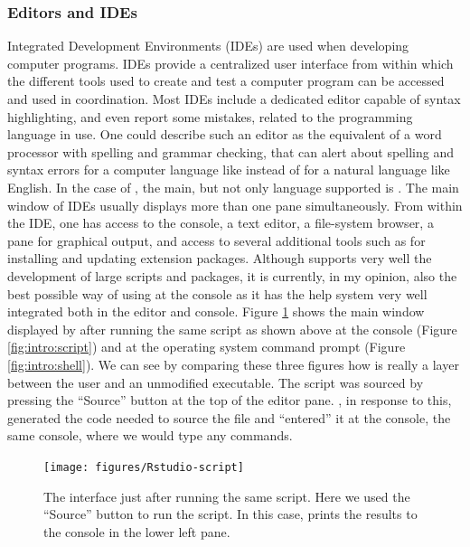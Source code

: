 \documentclass[krantz2]{krantz}\usepackage{knitr}
\begin{document}
\subsubsection{Editors and IDEs}

Integrated Development Environments (IDEs) are used when developing computer programs. IDEs provide a centralized user interface from within which the different tools used to create and test a computer program can be accessed and used in coordination. Most IDEs include a dedicated editor capable of syntax highlighting, and even report some mistakes, related to the programming language in use. One could describe such an editor as the equivalent of a word processor with spelling and grammar checking, that can alert about spelling and syntax errors for a computer language like \Rlang instead of for a natural language like English. In the case of \RStudio, the main, but not only language supported is \Rlang. The main window of IDEs usually displays more than one pane simultaneously. From within the \RStudio IDE, one has access to the \Rpgrm console, a text editor, a file-system browser, a pane for graphical output, and access to several additional tools such as for installing and updating extension packages. Although \RStudio supports very well the development of large scripts and packages, it is currently, in my opinion, also the best possible way of using \Rpgrm at the console as it has the \Rpgrm help system very well integrated both in the editor and \Rlang console. Figure \ref{fig:intro:rstudio} shows the main window displayed by \RStudio after running the same script as shown above at the \Rpgrm console (Figure \ref{fig:intro:script}) and at the operating system command prompt (Figure \ref{fig:intro:shell}). We can see by comparing these three figures how \RStudio is really a layer between the user and an unmodified \Rpgrm executable. The script was sourced by pressing the ``Source'' button at the top of the editor pane. \RStudio, in response to this, generated the code needed to source the file and ``entered'' it at the console, the same console, where we would type any \Rpgrm commands.

\begin{figure}
  \centering
  \texttt{[image: figures/Rstudio-script]}
  \caption[Script in Rstudio]{The \RStudio interface just after running the same script. Here we used the ``Source'' button to run the script. In this case, \Rpgrm prints the results to the \Rpgrm console in the lower left pane.}\label{fig:intro:rstudio}
\end{figure}
\end{document}
